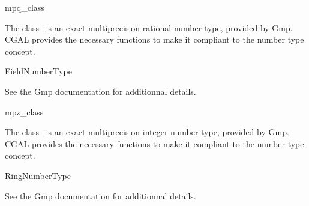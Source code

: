 \ccDefGlobalScope{}

% 
% 
% 
% 
% 
% 

\begin{ccRefClass}{mpq_class}

\ccDefinition

The class \ccRefName\ is an exact multiprecision rational number type,
provided by {\sc Gmp}.
CGAL provides the necessary functions to make it compliant to the number type
concept.


\ccIsModel
FieldNumberType

See the {\sc Gmp} documentation for additionnal details.

\end{ccRefClass}

\begin{ccRefClass}{mpz_class}

\ccDefinition

The class \ccRefName\ is an exact multiprecision integer number type,
provided by {\sc Gmp}.
CGAL provides the necessary functions to make it compliant to the number type
concept.


\ccIsModel
RingNumberType

See the {\sc Gmp} documentation for additionnal details.

\end{ccRefClass}
